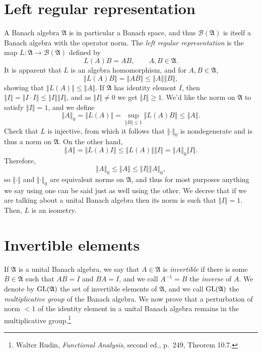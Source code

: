 \documentclass{article}
\newcommand{\GL}{\ensuremath\mathrm{GL}}
\newcommand{\norm}[1]{\left\Vert #1 \right\Vert}
\theoremstyle{definition}
\theoremstyle{definition}
\begin{document}
\section{Left regular representation}
A Banach algebra $\mathfrak{A}$ is in particular a Banach space, and thus $\mathscr{B}(\mathfrak{A})$
is itself a Banach algebra with the operator norm. The {\em left regular representation} is the map $L:\mathfrak{A} \to \mathscr{B}(\mathfrak{A})$ defined by
\[
L(A)B=AB, \qquad A,B \in \mathfrak{A}.
\]
It is apparent that $L$ is an algebra homomorphism, and for $A,B \in \mathfrak{A}$,
\[
\norm{L(A)B} = \norm{AB} \leq \norm{A} \norm{B},
\]
showing that $\norm{L(A)} \leq \norm{A}$. If $\mathfrak{A}$ has identity element $I$, then
$\norm{I}=\norm{I\cdot I} \leq \norm{I} \norm{I}$, and as $\norm{I} \neq 0$ we get $\norm{I} \geq 1$.
We'd like the norm on $\mathfrak{A}$ to satisfy $\norm{I}=1$, and we define 
\[
\norm{A}_0=\norm{L(A)}=\sup_{\norm{B} \leq 1} \norm{L(A)B} \leq \norm{A}.
\]
Check that $L$ is injective, from which it follows that $\norm{\cdot}_0$ is nondegenerate and is thus a norm on $\mathfrak{A}$. On the other hand,
\[
\norm{A} = \norm{L(A)I} \leq \norm{L(A)} \norm{I}=\norm{A}_0 \norm{I}.
\]
Therefore,
\[
\norm{A}_0 \leq \norm{A} \leq \norm{I} \norm{A}_0,
\]
so $\norm{\cdot}$ and $\norm{\cdot}_0$ are equivalent norms on $\mathfrak{A}$, and thus for most purposes anything we say using one can be said just as well using the other.
We decree that if we are talking about a unital Banach algebra then its norm is such that $\norm{I}=1$. Then, $L$ is an isometry.


\section{Invertible elements}
If $\mathfrak{A}$ is a unital Banach algebra, we say that $A \in \mathfrak{A}$ is {\em invertible} if there is some $B \in \mathfrak{A}$ such that
$AB=I$ and $BA=I$, and we call $A^{-1}=B$ the {\em inverse} of $A$. We denote by
 $\GL(\mathfrak{A})$ the set of invertible elements of $\mathfrak{A}$, and we call $\GL(\mathfrak{A})$ the {\em multiplicative group} of the Banach algebra.
We now prove that a   perturbation of norm $<1$ of the identity element in a unital Banach algebra remains in the multiplicative group.\footnote{Walter Rudin, {\em Functional Analysis}, second ed., p.~249, Theorem 10.7.}
 
\end{document}
